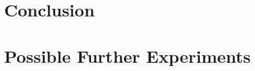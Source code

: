\documentclass[conference]{IEEEtran}
\begin{document}
\section{Conclusion}
\section{Possible Further Experiments}



\end{document}
